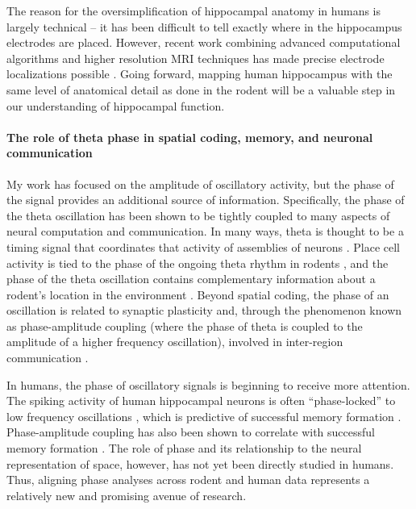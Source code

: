 The reason for the oversimplification of hippocampal anatomy in humans is largely technical -- it has been difficult to tell exactly where in the hippocampus electrodes are placed. However, recent work combining advanced computational algorithms and higher resolution MRI techniques has made precise electrode localizations possible \citep{YushEtal15,DyksEtal12}. Going forward, mapping human hippocampus with the same level of anatomical detail as done in the rodent will be a valuable step in our understanding of hippocampal function.



\paragraph{The role of theta phase in spatial coding, memory, and neuronal communication}
My work has focused on the amplitude of oscillatory activity, but the phase of the signal provides an additional source of information. Specifically, the phase of the theta oscillation has been shown to be tightly coupled to many aspects of neural computation and communication. In many ways, theta is thought to be a timing signal that coordinates that activity of assemblies of neurons \citep{Buzs05}. Place cell activity is tied to the phase of the ongoing theta rhythm in rodents \citep{OKeeRecc93,SkagEtal96}, and the phase of the theta oscillation contains complementary information about a rodent's location in the environment \citep{AgarEtal14}. Beyond spatial coding, the phase of an oscillation is related to synaptic plasticity \citep{BuzsDrag04,HuerLism93} and, through the phenomenon known as phase-amplitude coupling (where the phase of theta is coupled to the amplitude of a higher frequency oscillation), involved in inter-region communication \citep{ColgEtal09}.

In humans, the phase of oscillatory signals is beginning to receive more attention. The spiking activity of human hippocampal neurons is often ``phase-locked'' to low frequency oscillations \citep{JacoEtal07}, which is predictive of successful memory formation \citep{RutiEtal10}. Phase-amplitude coupling has also been shown to correlate with successful memory formation \citep{CanoEtal06,LegaEtal14}. The role of phase and its relationship to the neural representation of space, however, has not yet been directly studied in humans. Thus, aligning phase analyses across rodent and human data represents a relatively new and promising avenue of research.


